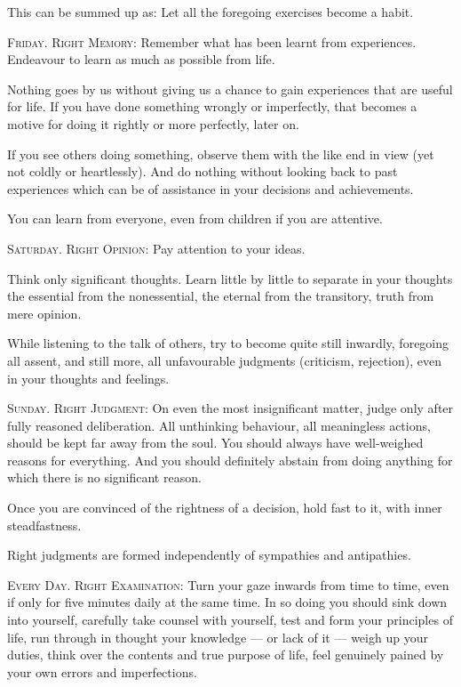 This can be summed up as: Let all the foregoing exercises become a habit.

\textsc{Friday. Right Memory}:
Remember what has been learnt from experiences. Endeavour to learn as much as possible from life.

Nothing goes by us without giving us a chance to gain experiences that are useful for life. If you have done something
wrongly or imperfectly, that becomes a motive for doing it rightly or more perfectly, later on.

If you see others doing something, observe them with the like end in view (yet not coldly or heartlessly). And do
nothing without looking back to past experiences which can be of assistance in your decisions and achievements.

You can learn from everyone, even from children if you are attentive.

\textsc{Saturday. Right Opinion}:
Pay attention to your ideas.

Think only significant thoughts. Learn little by little to separate in your thoughts the essential from the
nonessential, the eternal from the transitory, truth from mere opinion.

While listening to the talk of others, try to become quite still inwardly, foregoing all assent, and still more, all
unfavourable judgments (criticism, rejection), even in your thoughts and feelings.

\textsc{Sunday. Right Judgment}:
On even the most insignificant matter, judge only after fully reasoned deliberation. All unthinking behaviour, all
meaningless actions, should be kept far away from the soul. You should always have well-weighed reasons for everything.
And you should definitely abstain from doing anything for which there is no significant reason.

Once you are convinced of the rightness of a decision, hold fast to it, with inner steadfastness.

Right judgments are formed independently of sympathies and antipathies.

\textsc{Every Day. Right Examination}:
Turn your gaze inwards from time to time, even if only for five minutes daily at the same time. In so doing you should
sink down into yourself, carefully take counsel with yourself, test and form your principles of life, run through in
thought your knowledge — or lack of it — weigh up your duties, think over the
contents and true purpose of life, feel genuinely pained by your own errors and imperfections.

